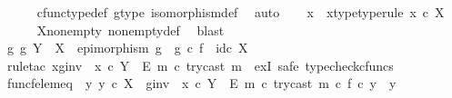 \begin{isabellebody}
\ \ \ \ \isamarkupfalse%
\ cfunc{\isacharunderscore}{\kern0pt}type{\isacharunderscore}{\kern0pt}def\ g{\isacharunderscore}{\kern0pt}type\ isomorphism{\isacharunderscore}{\kern0pt}def\ \isamarkupfalse%
\ auto\isanewline
\isanewline
\ \ \isamarkupfalse%
\ x\ \ x{\isacharunderscore}{\kern0pt}type{\isacharbrackleft}{\kern0pt}type{\isacharunderscore}{\kern0pt}rule{\isacharbrackright}{\kern0pt}{\isacharcolon}{\kern0pt}\ {\isachardoublequoteopen}x\ {\isasymin}\isactrlsub c\ X{\isachardoublequoteclose}\isanewline
\ \ \ \ \isamarkupfalse%
\ X{\isacharunderscore}{\kern0pt}nonempty\ nonempty{\isacharunderscore}{\kern0pt}def\ \isamarkupfalse%
\ blast\isanewline
\isanewline
\ \ \isamarkupfalse%
\ {\isachardoublequoteopen}{\isasymexists}g{\isachardot}{\kern0pt}\ g{\isacharcolon}{\kern0pt}\ Y\ {\isasymrightarrow}\ X\ {\isasymand}\ epimorphism\ g\ {\isasymand}\ g\ {\isasymcirc}\isactrlsub c\ f\ {\isacharequal}{\kern0pt}\ id\isactrlsub c\ X{\isachardoublequoteclose}\isanewline
\ \ \isamarkupfalse%
\ {\isacharparenleft}{\kern0pt}rule{\isacharunderscore}{\kern0pt}tac\ x{\isacharequal}{\kern0pt}{\isachardoublequoteopen}{\isacharparenleft}{\kern0pt}g{\isacharunderscore}{\kern0pt}inv\ {\isasymamalg}\ {\isacharparenleft}{\kern0pt}x\ {\isasymcirc}\isactrlsub c\ {\isasymbeta}\isactrlbsub Y\ {\isasymsetminus}\ {\isacharparenleft}{\kern0pt}E{\isacharcomma}{\kern0pt}\ m{\isacharparenright}{\kern0pt}\isactrlesub {\isacharparenright}{\kern0pt}{\isacharparenright}{\kern0pt}\ {\isasymcirc}\isactrlsub c\ try{\isacharunderscore}{\kern0pt}cast\ m{\isachardoublequoteclose}\ \ exI{\isacharcomma}{\kern0pt}\ safe{\isacharcomma}{\kern0pt}\ typecheck{\isacharunderscore}{\kern0pt}cfuncs{\isacharparenright}{\kern0pt}\isanewline
\ \ \ \ \isamarkupfalse%
\ func{\isacharunderscore}{\kern0pt}f{\isacharunderscore}{\kern0pt}elem{\isacharunderscore}{\kern0pt}eq{\isacharcolon}{\kern0pt}\ {\isachardoublequoteopen}{\isasymAnd}\ y{\isachardot}{\kern0pt}\ y\ {\isasymin}\isactrlsub c\ X\ {\isasymLongrightarrow}\ {\isacharparenleft}{\kern0pt}g{\isacharunderscore}{\kern0pt}inv\ {\isasymamalg}\ {\isacharparenleft}{\kern0pt}x\ {\isasymcirc}\isactrlsub c\ {\isasymbeta}\isactrlbsub Y\ {\isasymsetminus}\ {\isacharparenleft}{\kern0pt}E{\isacharcomma}{\kern0pt}\ m{\isacharparenright}{\kern0pt}\isactrlesub {\isacharparenright}{\kern0pt}\ {\isasymcirc}\isactrlsub c\ try{\isacharunderscore}{\kern0pt}cast\ m{\isacharparenright}{\kern0pt}\ {\isasymcirc}\isactrlsub c\ f\ {\isasymcirc}\isactrlsub c\ y\ {\isacharequal}{\kern0pt}\ y{\isachardoublequoteclose}\isanewline

\end{isabellebody}
